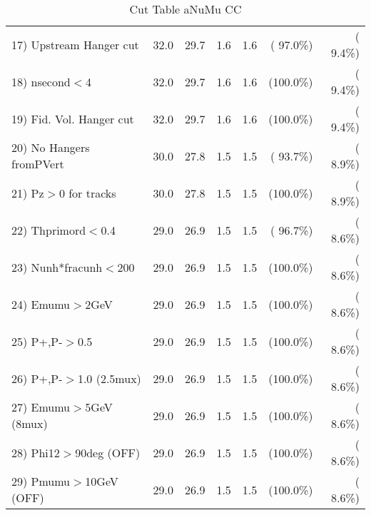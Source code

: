 \begin{table}[h!]
\begin{tabular}{||l||r|r|r|r|r|r||}
 17) Upstream Hanger cut  &         32.0 &         29.7 &          1.6 &          1.6 & ( 97.0\%) & (  9.4\%) \\
 18) nsecond$<$4          &         32.0 &         29.7 &          1.6 &          1.6 & (100.0\%) & (  9.4\%) \\
 19) Fid. Vol. Hanger cut &         32.0 &         29.7 &          1.6 &          1.6 & (100.0\%) & (  9.4\%) \\
 20) No Hangers fromPVert &         30.0 &         27.8 &          1.5 &          1.5 & ( 93.7\%) & (  8.9\%) \\
 21) Pz$>$0 for tracks    &         30.0 &         27.8 &          1.5 &          1.5 & (100.0\%) & (  8.9\%) \\
 22) Thprimord$<$0.4      &         29.0 &         26.9 &          1.5 &          1.5 & ( 96.7\%) & (  8.6\%) \\
 23) Nunh*fracunh$<$200   &         29.0 &         26.9 &          1.5 &          1.5 & (100.0\%) & (  8.6\%) \\
 24) Emumu$>$2GeV         &         29.0 &         26.9 &          1.5 &          1.5 & (100.0\%) & (  8.6\%) \\
 25) P+,P-$>$0.5          &         29.0 &         26.9 &          1.5 &          1.5 & (100.0\%) & (  8.6\%) \\
 26) P+,P-$>$1.0 (2.5mux) &         29.0 &         26.9 &          1.5 &          1.5 & (100.0\%) & (  8.6\%) \\
 27) Emumu$>$5GeV  (8mux) &         29.0 &         26.9 &          1.5 &          1.5 & (100.0\%) & (  8.6\%) \\
 28) Phi12$>$90deg  (OFF) &         29.0 &         26.9 &          1.5 &          1.5 & (100.0\%) & (  8.6\%) \\
 29) Pmumu$>$10GeV  (OFF) &         29.0 &         26.9 &          1.5 &          1.5 & (100.0\%) & (  8.6\%) \\
 \hline
 \hline
 \end{tabular}
 \caption{Cut Table  aNuMu CC }
 \label{tab-cutcohjpsi-mumu_res}
 \end{table}
